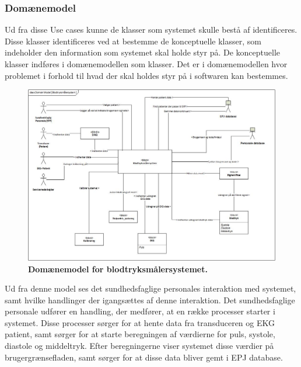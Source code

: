 \subsubsection{Domænemodel} 
Ud fra disse Use cases kunne de klasser som systemet skulle bestå af identificeres. Disse klasser identificeres ved at bestemme de konceptuelle klasser, som indeholder den information som systemet skal holde styr på. De konceptuelle klasser indføres i domænemodellen som klasser. Det er i domænemodellen hvor problemet i forhold til hvad der skal holdes styr på i softwaren kan bestemmes. 
\begin{figure}[H]
\includegraphics[width =1.0\textwidth , center]{billeder/DM}
\caption{\textbf{Domænemodel for blodtryksmålersystemet.}}
\end{figure}
Ud fra denne model ses det sundhedsfaglige personales interaktion med systemet, samt hvilke handlinger der igangsættes af denne interaktion. Det sundhedsfaglige personale udfører en handling, der medfører, at en række processer starter i systemet. Disse processer sørger for
at hente data fra transduceren og EKG patient, samt sørger for at starte beregningen af værdierne for puls,
systole, diastole og middeltryk. Efter beregningerne viser systemet disse værdier på brugergrænsefladen, samt sørger for at disse data bliver gemt i EPJ database. 
